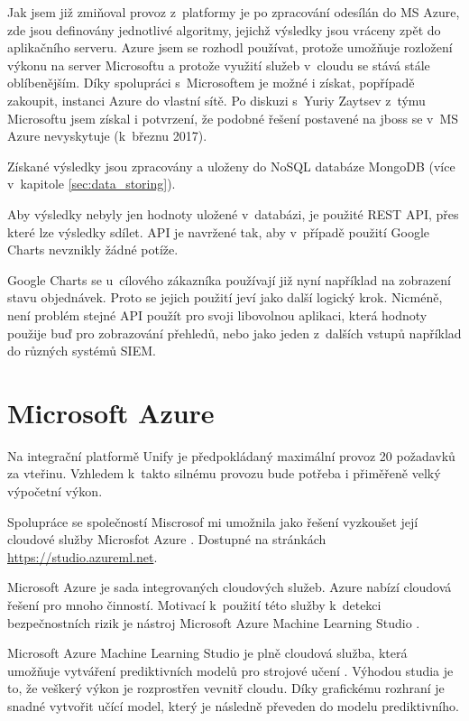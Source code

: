 \documentclass[thesis=M,czech]{FITthesis}[2012/10/20]
\begin{document}
	Jak jsem již zmiňoval provoz z~platformy je po zpracování odesílán do MS Azure, zde jsou definovány jednotlivé algoritmy, jejichž výsledky jsou vráceny zpět do aplikačního serveru. Azure jsem se rozhodl používat, protože umožňuje rozložení výkonu na server Microsoftu a protože využití služeb v~cloudu se stává stále oblíbenějším. Díky spolupráci s~Microsoftem je možné i získat, popřípadě zakoupit, instanci Azure do vlastní sítě. Po diskuzi s~Yuriy Zaytsev z~týmu Microsoftu jsem získal i potvrzení, že podobné řešení postavené na jboss se v~MS Azure nevyskytuje (k~březnu 2017).
	
	Získané výsledky jsou zpracovány a uloženy do NoSQL databáze MongoDB (více v~kapitole \ref{sec:data_storing}).
	
	Aby výsledky nebyly jen hodnoty uložené v~databázi, je použité REST API, přes které lze výsledky sdílet. API je navržené tak, aby v~případě použití Google Charts nevznikly žádné potíže. 
	
	Google Charts se u~cílového zákazníka používají již nyní například na zobrazení stavu objednávek. Proto se jejich použití jeví jako další logický krok. Nicméně, není problém stejné API použít pro svoji libovolnou aplikaci, která hodnoty použije buď pro zobrazování přehledů, nebo jako jeden z~dalších vstupů například do různých systémů SIEM.

	\section{Microsoft Azure}
		\label{sec:ms_azure}
		Na integrační platformě Unify \cite{unify} je předpokládaný maximální provoz 20 požadavků za vteřinu. Vzhledem k~takto silnému provozu bude potřeba i přiměřeně velký výpočetní výkon. 
			
		Spolupráce se společností Miscrosof \cite{microsoft} mi umožnila jako řešení vyzkoušet její cloudové služby Microsfot Azure \cite{msAzure}. Dostupné na stránkách \url{https://studio.azureml.net}.
			
		Microsoft Azure je sada integrovaných cloudových služeb. Azure nabízí cloudová řešení pro mnoho činností. Motivací k~použití této služby k~detekci bezpečnostních rizik je nástroj Microsoft Azure Machine Learning Studio \cite{msAzureStudio}.
			
		Microsoft Azure Machine Learning Studio je plně cloudová služba, která umožňuje vytváření prediktivních modelů pro strojové učení \cite{msAzureStudio}. Výhodou studia je to, že veškerý výkon je rozprostřen vevnitř cloudu. Díky grafickému rozhraní je snadné vytvořit učící model, který je následně převeden do modelu prediktivního.
			
\end{document}
